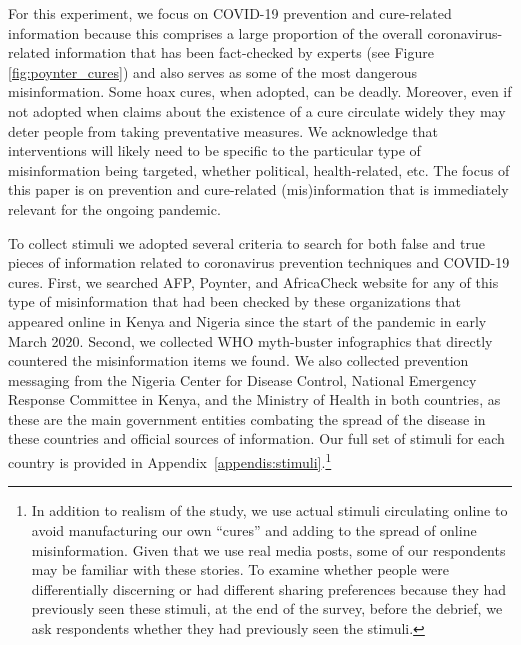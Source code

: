 \documentclass[letterpaper, 12pt, parskip=full,]{scrartcl}
\begin{document}
For this experiment, we focus on COVID-19 prevention and cure-related information because this comprises a large proportion of the overall coronavirus-related information that has been fact-checked by experts (see Figure \ref{fig:poynter_cures}) and also serves as some of the most dangerous misinformation. Some hoax cures, when adopted, can be deadly. Moreover, even if not adopted when claims about the existence of a cure circulate widely they may deter people from taking preventative measures. We acknowledge that interventions will likely need to be specific to the particular type of misinformation being targeted, whether political, health-related, etc. The focus of this paper is on prevention and cure-related (mis)information that is immediately relevant for the ongoing pandemic. 

To collect stimuli we adopted several criteria to search for both false and true pieces of information related to coronavirus prevention techniques and COVID-19 cures. First, we searched AFP, Poynter, and AfricaCheck website for any of this type of misinformation that had been checked by these organizations that appeared online in Kenya and Nigeria since the start of the pandemic in early March 2020. Second, we collected WHO myth-buster infographics that directly countered the misinformation items we found. We also collected prevention messaging from the Nigeria Center for Disease Control, National Emergency Response Committee in Kenya, and the Ministry of Health in both countries, as these are the main government entities combating the spread of the disease in these countries and official sources of information. Our full set of stimuli for each country is provided in Appendix~\ref{appendis:stimuli}.\footnote{In addition to realism of the study, we use actual stimuli circulating online to avoid manufacturing our own ``cures'' and adding to the spread of online misinformation. Given that we use real media posts, some of our respondents may be familiar with these stories. To examine whether people were differentially discerning \citep{nyhan2020facts} or had different sharing preferences because they had previously seen these stimuli, at the end of the survey, before the debrief, we ask respondents whether they had previously seen the stimuli.}
\end{document}
